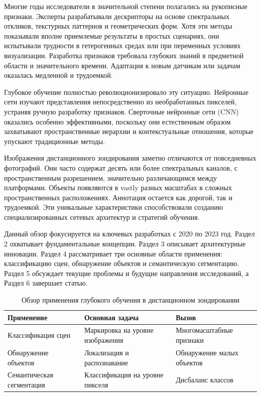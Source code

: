\documentclass[12pt,a4paper]{article}
\begin{document}
Многие годы исследователи в значительной степени полагались на рукописные признаки. Эксперты разрабатывали дескрипторы на основе спектральных откликов, текстурных паттернов и геометрических форм. Хотя эти методы показывали вполне приемлемые результаты в простых сценариях, они испытывали трудности в гетерогенных средах или при переменных условиях визуализации. Разработка признаков требовала глубоких знаний в предметной области и значительного времени. Адаптация к новым датчикам или задачам оказалась медленной и трудоемкой.

Глубокое обучение полностью революционизировало эту ситуацию. Нейронные сети изучают представления непосредственно из необработанных пикселей, устраняя ручную разработку признаков. Сверточные нейронные сети (CNN) оказались особенно эффективными, поскольку они естественным образом захватывают пространственные иерархии и контекстуальные отношения, которые упускают традиционные методы.

Изображения дистанционного зондирования заметно отличаются от повседневных фотографий. Они часто содержат десять или более спектральных каналов, с пространственным разрешением, значительно различающимся между платформами. Объекты появляются в vastly разных масштабах в сложных пространственных расположениях. Аннотация остается как дорогой, так и трудоемкой. Эти уникальные характеристики способствовали созданию специализированных сетевых архитектур и стратегий обучения.

Данный обзор фокусируется на ключевых разработках с 2020 по 2023 год. Раздел 2 охватывает фундаментальные концепции. Раздел 3 описывает архитектурные инновации. Раздел 4 рассматривает три основные области применения: классификацию сцен, обнаружение объектов и семантическую сегментацию. Раздел 5 обсуждает текущие проблемы и будущие направления исследований, а Раздел 6 завершает статью.

\begin{table}[htbp]
\centering
\caption{Обзор применения глубокого обучения в дистанционном зондировании}
\label{tab:applications}
\begin{tabular}{@{}lll@{}}
\toprule
\textbf{Применение} & \textbf{Основная задача} & \textbf{Вызов} \\
\midrule
Классификация сцен & Маркировка на уровне изображения & Многомасштабные признаки \\
Обнаружение объектов & Локализация и распознавание & Обнаружение малых объектов \\
Семантическая сегментация & Классификация на уровне пикселя & Дисбаланс классов \\
\bottomrule
\end{tabular}
\end{table}
\end{document}
